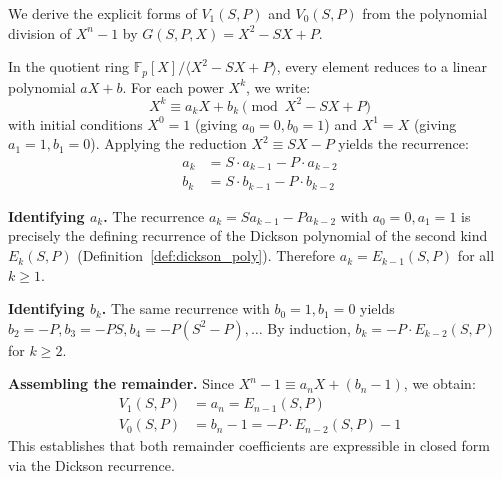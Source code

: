 \documentclass[12pt]{article}
\theoremstyle{plain}
\begin{document}
We derive the explicit forms of $V_1(S, P)$ and $V_0(S, P)$ from the polynomial division of $X^n - 1$ by $G(S, P, X) = X^2 - SX + P$.

In the quotient ring $\mathbb{F}_p[X] / \langle X^2 - SX + P \rangle$, every element reduces to a linear polynomial $aX + b$. For each power $X^k$, we write:
\begin{equation}
    X^k \equiv a_k X + b_k \pmod{X^2 - SX + P}
\end{equation}
with initial conditions $X^0 = 1$ (giving $a_0 = 0, b_0 = 1$) and $X^1 = X$ (giving $a_1 = 1, b_1 = 0$). Applying the reduction $X^2 \equiv SX - P$ yields the recurrence:
\begin{align}
    a_k &= S \cdot a_{k-1} - P \cdot a_{k-2} \\
    b_k &= S \cdot b_{k-1} - P \cdot b_{k-2}
\end{align}

\textbf{Identifying $a_k$.} The recurrence $a_k = S a_{k-1} - P a_{k-2}$ with $a_0 = 0, a_1 = 1$ is precisely the defining recurrence of the Dickson polynomial of the second kind $E_k(S, P)$ (Definition~\ref{def:dickson_poly}). Therefore $a_k = E_{k-1}(S, P)$ for all $k \geq 1$.

\textbf{Identifying $b_k$.} The same recurrence with $b_0 = 1, b_1 = 0$ yields $b_2 = -P, b_3 = -PS, b_4 = -P(S^2 - P), \dots$ By induction, $b_k = -P \cdot E_{k-2}(S, P)$ for $k \geq 2$.

\textbf{Assembling the remainder.} Since $X^n - 1 \equiv a_n X + (b_n - 1)$, we obtain:
\begin{align}
    V_1(S, P) &= a_n = E_{n-1}(S, P) \\
    V_0(S, P) &= b_n - 1 = -P \cdot E_{n-2}(S, P) - 1
\end{align}
This establishes that both remainder coefficients are expressible in closed form via the Dickson recurrence.



\end{document}
